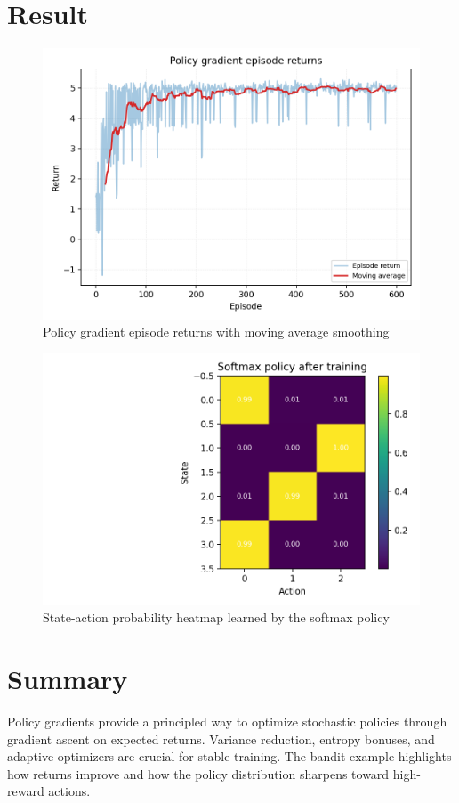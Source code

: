 ﻿\documentclass[12pt]{article}
\begin{document}
\section{Result}
\begin{figure}[H]
  \centering
  \includegraphics[width=0.8\linewidth]{policy_gradient_returns.png}
  \caption{Policy gradient episode returns with moving average smoothing}
  \label{fig:policy_gradient_returns}
\end{figure}

\begin{figure}[H]
  \centering
  \includegraphics[width=0.82\linewidth]{policy_gradient_policy_heatmap.png}
  \caption{State-action probability heatmap learned by the softmax policy}
  \label{fig:policy_gradient_policy_heatmap}
\end{figure}

\FloatBarrier
\section{Summary}
Policy gradients provide a principled way to optimize stochastic policies through gradient ascent on expected returns. Variance reduction, entropy bonuses, and adaptive optimizers are crucial for stable training. The bandit example highlights how returns improve and how the policy distribution sharpens toward high-reward actions.
\end{document}
